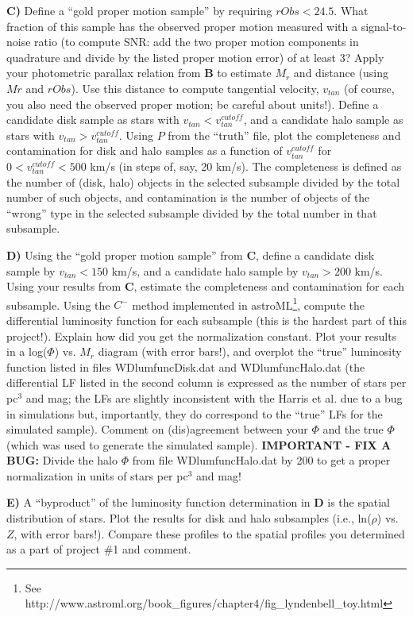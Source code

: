 {\bf C)} Define a ``gold proper motion sample'' by requiring $rObs < 24.5$. What fraction of
this sample has the observed proper motion measured with a signal-to-noise ratio (to compute
SNR: add the two proper motion components in quadrature and divide by the listed proper
motion error) of at least 3? Apply your photometric parallax relation from {\bf B} to estimate
$M_r$ and distance (using $Mr$ and $rObs$). Use this distance to compute tangential velocity,
$v_{tan}$ (of course, you also need the observed proper motion; be careful about units!). Define
a candidate disk sample as stars with $v_{tan}< v_{tan}^{cutoff}$, and a candidate halo sample as stars with
$v_{tan} > v_{tan}^{cutoff}$. Using $P$ from the “truth” file, plot the completeness and contamination 
for disk and halo samples as a function of $v_{tan}^{cutoff}$ for $0 < v_{tan}^{cutoff} < 500$ km/s (in steps 
of, say, 20 km/s). The completeness is defined as the number of (disk, halo) objects in the selected 
subsample divided by the total number of such objects, and contamination is the number of objects
 of the ``wrong'' type in the selected subsample divided by the total number in that subsample.

{\bf D)} Using the ``gold proper motion sample'' from {\bf C}, define a candidate disk sample by
$v_{tan} < 150$ km/s, and a candidate halo sample by $v_{tan} > 200$ km/s. Using your results 
from {\bf C}, estimate the completeness and contamination for each subsample. Using the 
$C^−$ method implemented in astroML\footnote{See
http://www.astroml.org/book_figures/chapter4/fig_lyndenbell_toy.html}, 
compute the differential luminosity function for each subsample (this is the hardest 
part of this project!). Explain how did you get the normalization constant. Plot your results in a
log($\Phi$) vs. $M_r$ diagram (with error bars!), and overplot the “true” luminosity function listed in 
files WDlumfuncDisk.dat and WDlumfuncHalo.dat (the differential LF listed in the second column is 
expressed as the number of stars per pc$^3$ and mag; the LFs are slightly inconsistent with the Harris 
et al. due to a bug in simulations but, importantly, they do correspond to the ``true'' LFs for the simulated 
sample). Comment on (dis)agreement between your $\Phi$ and the true $\Phi$ (which was used to generate 
the simulated sample). {\bf IMPORTANT - FIX A BUG:} Divide the halo $\Phi$ from file WDlumfuncHalo.dat 
by 200 to get a proper normalization in units of stars per pc$^3$ and mag! 

{\bf E)} A ``byproduct'' of the luminosity function determination in {\bf D} is the spatial distribution of stars. 
Plot the results for disk and halo subsamples (i.e., ln($\rho$) vs. $Z$, with error bars!). Compare these profiles
 to the spatial profiles you determined as a part of project \#1 and comment.




